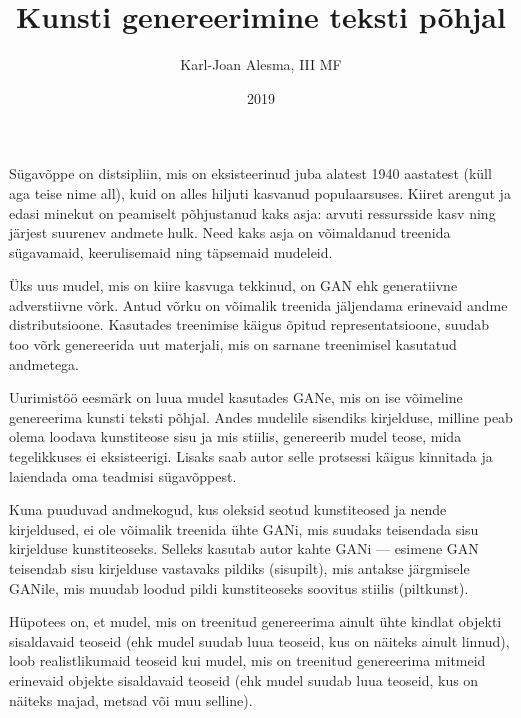 \documentclass{vilgym}
\title{Kunsti genereerimine teksti põhjal}
\author{Karl-Joan Alesma, III MF}
\date{2019}
\begin{document}
	\maketitle
	\tableofcontents



	\newcommand*{\ingk}[1]{(\textit{ing. k. #1})}

	Sügavõppe on distsipliin, mis on eksisteerinud juba alatest 1940 aastatest (küll aga teise nime all), kuid on alles hiljuti kasvanud populaarsuses. Kiiret arengut ja edasi minekut on peamiselt põhjustanud kaks asja: arvuti ressursside kasv ning järjest suurenev andmete hulk. Need kaks asja on võimaldanud treenida sügavamaid, keerulisemaid ning täpsemaid mudeleid. \parencite{deeplearningbook}	 

	Üks uus mudel, mis on kiire kasvuga tekkinud, on GAN ehk generatiivne adverstiivne võrk. Antud võrku on võimalik treenida jäljendama erinevaid andme distributsioone. Kasutades treenimise käigus õpitud representatsioone, suudab too võrk genereerida uut materjali, mis on sarnane treenimisel kasutatud andmetega. \parencite{gan}

	Uurimistöö eesmärk on luua mudel kasutades GANe, mis on ise võimeline genereerima kunsti teksti põhjal. Andes mudelile sisendiks kirjelduse, milline peab olema loodava kunstiteose sisu ja mis stiilis, genereerib mudel teose, mida tegelikkuses ei eksisteerigi. Lisaks saab autor selle protsessi käigus kinnitada ja laiendada oma teadmisi sügavõppest.

	Kuna puuduvad andmekogud, kus oleksid seotud kunstiteosed ja nende kirjeldused, ei ole võimalik treenida ühte GANi, mis suudaks teisendada sisu kirjelduse kunstiteoseks. Selleks kasutab autor kahte GANi --- esimene GAN teisendab sisu kirjelduse vastavaks pildiks (sisu\textrightarrow pilt), mis antakse järgmisele GANile, mis muudab loodud pildi kunstiteoseks soovitus stiilis (pilt\textrightarrow kunst).

	Hüpotees on, et mudel, mis on treenitud genereerima ainult ühte kindlat objekti sisaldavaid teoseid (ehk mudel suudab luua teoseid, kus on näiteks ainult linnud), loob realistlikumaid teoseid kui mudel, mis on treenitud genereerima mitmeid erinevaid objekte sisaldavaid teoseid (ehk mudel suudab luua teoseid, kus on näiteks majad, metsad või muu selline).
\end{document}
